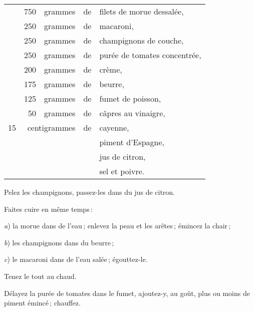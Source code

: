 \footnotesize
\begin{longtable}{rrrrp{16em}}
   & 750 & grammes & de & filets de morue dessalée,                                                       \\
   & 250 & grammes & de & macaroni,                                                                       \\
   & 250 & grammes & de & champignons de couche,                                                          \\
   & 250 & grammes & de & purée de tomates concentrée,                                                    \\
   & 200 & grammes & de & crème,                                                                          \\
   & 175 & grammes & de & beurre,                                                                         \\
   & 125 & grammes & de & fumet de poisson,                                                               \\
   &  50 & grammes & de & câpres au vinaigre,                                                             \\
15 & \multicolumn{2}{r}{centigrammes} & de & cayenne,                                                     \\
   &     &         &    & piment d'Espagne,                                                               \\
   &     &         &    & jus de citron,                                                                  \\
   &     &         &    & sel et poivre.                                                                  \\
\end{longtable}
\normalsize

Pelez les champignons, passez-les dans du jus de citron.

Faites cuire en même temps :

\textit{a}) la morue dans de l'eau ; enlevez la peau et les arêtes ; émincez la chair ;

\textit{b}) les champignons dans du beurre ;

\textit{c}) le macaroni dans de l'eau salée ; égouttez-le.

Tenez le tout au chaud.

Délayez la purée de tomates dans le fumet, ajoutez-y, au goût, plus ou moins de
piment émincé ; chauffez.

